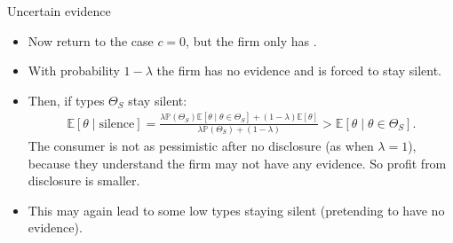 \documentclass[english,10pt
,aspectratio=169
]{beamer}
\begin{document}
\begin{frame}{Uncertain evidence \citep{dye_disclosure_1985,jung_disclosure_1988}}
\begin{itemize}
	\item Now return to the case $c=0$, but the firm only has .
	\item With probability $1-\lambda$ the firm has no evidence and is forced to stay silent.
	\item Then, if types $\Theta_S$ stay silent:
	\begin{align*}
		\mathbb{E}[\theta \mid \text{silence}] = \frac{\lambda \mathbb{P}(\Theta_S) \mathbb{E}[\theta \mid \theta \in \Theta_S] + (1-\lambda) \mathbb{E}[\theta]}{\lambda \mathbb{P}(\Theta_S) + (1-\lambda)} > \mathbb{E}[\theta \mid \theta \in \Theta_S].
	\end{align*}
	The consumer is not as pessimistic after no disclosure (as when $\lambda=1$), because they understand the firm may not have any evidence. So profit from disclosure is smaller.
	\item This may again lead to some low types staying silent (pretending to have no evidence).
\end{itemize}
\end{frame}
\end{document}
